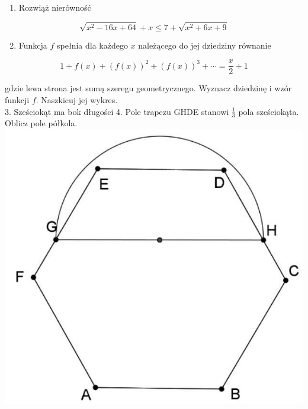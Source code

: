 \documentclass[10pt]{article}
\begin{document}
\begin{enumerate}
  \item Rozwiąż nierówność
\end{enumerate}

\[
\sqrt{x^{2}-16 x+64}+x \leq 7+\sqrt{x^{2}+6 x+9}
\]

\begin{enumerate}
  \setcounter{enumi}{1}
  \item Funkcja \(f\) spełnia dla każdego \(x\) należącego do jej dziedziny równanie
\end{enumerate}

\[
1+f(x)+(f(x))^{2}+(f(x))^{3}+\cdots=\frac{x}{2}+1
\]

gdzie lewa strona jest sumą szeregu geometrycznego. Wyznacz dziedzinę i wzór funkcji \(f\). Naszkicuj jej wykres.\\
3. Sześciokąt ma bok długości 4. Pole trapezu GHDE stanowi \(\frac{1}{3}\) pola sześciokąta. Oblicz pole półkola.\\
\includegraphics[max width=\textwidth, center]{2024_11_21_ce4f64a1d9a079355499g-1}
\end{document}
